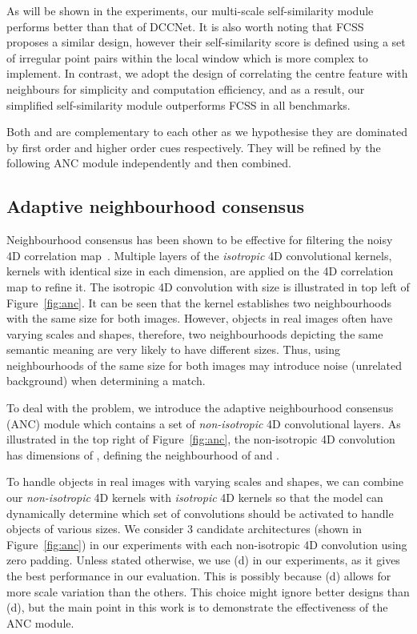 \documentclass[10pt,twocolumn,letterpaper]{article}
\begin{document}
As will be shown in the experiments, our multi-scale self-similarity module performs better than that of DCCNet.
It is also worth noting that FCSS~\cite{Kim_CVPR17_FCSS} proposes a similar design, however their self-similarity score is defined using a set of irregular point pairs within the local window which is more complex to implement.
In contrast, we adopt the design of correlating the centre feature with neighbours for simplicity and computation efficiency, and as a result, our simplified self-similarity module outperforms FCSS in all benchmarks.

Both  and  are complementary to each other as we hypothesise they are dominated by first order and higher order cues respectively.
They will be refined by the following ANC module independently and then combined.

\subsection{Adaptive neighbourhood consensus}
\label{sec:anc}
Neighbourhood consensus has been shown to be effective for filtering the noisy 4D correlation map~\cite{Rocco_NIPS18_NCNet,Huang_ICCV19_DCCNet}.
Multiple layers of the \emph{isotropic} 4D convolutional kernels, \ie kernels with identical size in each dimension, are applied on the 4D correlation map to refine it. The isotropic 4D convolution with size  is illustrated in top left of Figure~\ref{fig:anc}. It can be seen that the kernel establishes two neighbourhoods with the same size for both images. However, objects in real images often have varying scales and shapes, therefore, two neighbourhoods depicting the same semantic meaning are very likely to have different sizes. Thus, using neighbourhoods of the same size for both images may introduce noise (\eg unrelated background) when determining a match.

To deal with the problem, we introduce the adaptive neighbourhood consensus (ANC) module which contains a set of \emph{non-isotropic} 4D convolutional layers. As illustrated in the top right of Figure~\ref{fig:anc}, the non-isotropic 4D convolution has dimensions of , defining the neighbourhood of  and . 

To handle objects in real images with varying scales and shapes, we can combine our \emph{non-isotropic} 4D kernels with \emph{isotropic} 4D kernels so that the model can dynamically determine which set of convolutions should be activated to handle objects of various sizes. 
We consider 3 candidate architectures (shown in Figure~\ref{fig:anc}) in our experiments with each non-isotropic 4D convolution using zero padding. 
Unless stated otherwise, we use (d) in our experiments, as it gives the best performance in our evaluation.
This is possibly because (d) allows for more scale variation than the others.
This choice might ignore better designs than (d), but the main point in this work is to demonstrate the effectiveness of the ANC module.
\end{document}
